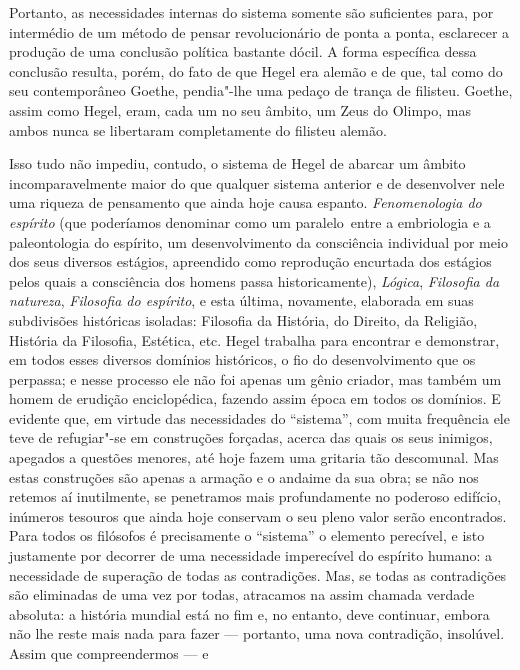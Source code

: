 Portanto, as necessidades internas do sistema somente são suficientes
para, por intermédio de um método de pensar revolucionário de ponta a
ponta, esclarecer a produção de uma conclusão política
bastante dócil. A forma específica dessa conclusão 
resulta, porém, do fato de que Hegel era alemão e de que, tal como do seu
contemporâneo Goethe, pendia"-lhe uma pedaço de trança de filisteu. Goethe, assim como Hegel, eram, cada um no seu âmbito, um Zeus do Olimpo, mas ambos nunca se
libertaram completamente do filisteu alemão.

Isso tudo não impediu, contudo, o sistema
de Hegel de abarcar um âmbito incomparavelmente maior do que qualquer sistema
anterior e de desenvolver nele uma riqueza de pensamento que
ainda hoje causa espanto. \emph{Fenomenologia do espírito} (que %
poderíamos denominar como um paralelo\est\ entre a embriologia e a
paleontologia do espírito, um desenvolvimento da consciência individual
por meio dos seus diversos estágios, apreendido como reprodução %
encurtada dos estágios pelos quais a consciência dos homens passa
historicamente), \emph{Lógica}, \emph{Filosofia da natureza},
\emph{Filosofia do espírito}, e esta última, novamente, elaborada em suas
subdivisões históricas isoladas: Filosofia da História, do Direito, da
Religião, História da Filosofia, Estética, etc.
Hegel trabalha
para encontrar e demonstrar, em todos esses diversos domínios
históricos, o fio do desenvolvimento que os perpassa; e nesse processo
ele não foi apenas um gênio criador, mas também um homem de erudição
enciclopédica, fazendo assim época em todos os domínios. E evidente que,
em virtude das necessidades do ``sistema'', com muita frequência ele
teve de refugiar"-se em construções forçadas, acerca das quais
os seus inimigos, apegados a questões menores, até hoje fazem uma
gritaria tão descomunal. Mas estas construções são apenas a armação e o
andaime da sua obra; se não nos retemos aí inutilmente, se penetramos
mais profundamente no poderoso edifício, inúmeros tesouros que ainda
hoje conservam o seu pleno valor serão encontrados. Para todos os
filósofos é precisamente o ``sistema'' o elemento perecível, e isto
justamente por decorrer de uma necessidade 
imperecível do espírito humano: a necessidade de superação
de todas as contradições. Mas, se todas as 
contradições são eliminadas de uma vez por todas, atracamos na assim
chamada verdade absoluta: a história mundial está no fim e, no entanto,
deve continuar, embora não lhe reste mais nada para fazer --- portanto,
uma nova contradição, insolúvel. Assim que compreendermos --- e
